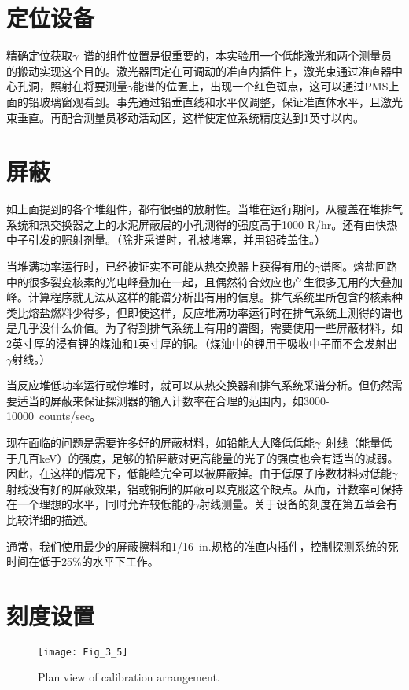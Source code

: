 \section{定位设备}

精确定位获取$\gamma$\ 谱的组件位置是很重要的，本实验用一个低能激光和两个测量员的搬动实现这个目的。激光器固定在可调动的准直内插件上，激光束通过准直器中心孔洞，照射在将要测量$\gamma$能谱的位置上，出现一个红色斑点，这可以通过PMS上面的铅玻璃窗观看到。事先通过铅垂直线和水平仪调整，保证准直体水平，且激光束垂直。再配合测量员移动活动区，这样使定位系统精度达到1英寸以内。

\section{屏蔽}

如上面提到的各个堆组件，都有很强的放射性。当堆在运行期间，从覆盖在堆排气系统和热交换器之上的水泥屏蔽层的小孔测得的强度高于1000 R/hr。还有由快热中子引发的照射剂量。（除非采谱时，孔被堵塞，并用铅砖盖住。）

当堆满功率运行时，已经被证实不可能从热交换器上获得有用的$\gamma$谱图。熔盐回路中的很多裂变核素的光电峰叠加在一起，且偶然符合效应也产生很多无用的大叠加峰。计算程序就无法从这样的能谱分析出有用的信息。排气系统里所包含的核素种类比熔盐燃料少得多，但即使这样，反应堆满功率运行时在排气系统上测得的谱也是几乎没什么价值。为了得到排气系统上有用的谱图，需要使用一些屏蔽材料，如2英寸厚的浸有锂的煤油和1英寸厚的铜。（煤油中的锂用于吸收中子而不会发射出$\gamma$射线。）

当反应堆低功率运行或停堆时，就可以从热交换器和排气系统采谱分析。但仍然需要适当的屏蔽来保证探测器的输入计数率在合理的范围内，如3000-10000\ counts/sec。

现在面临的问题是需要许多好的屏蔽材料，如铅能大大降低低能$\gamma$\ 射线（能量低于几百keV）的强度，足够的铅屏蔽对更高能量的光子的强度也会有适当的减弱。因此，在这样的情况下，低能峰完全可以被屏蔽掉。由于低原子序数材料对低能$\gamma$射线没有好的屏蔽效果，铝或铜制的屏蔽可以克服这个缺点。从而，计数率可保持在一个理想的水平，同时允许较低能的$\gamma$射线测量。关于设备的刻度在第五章会有比较详细的描述。

通常，我们使用最少的屏蔽擦料和1/16\ in.规格的准直内插件，控制探测系统的死时间在低于25\%的水平下工作。

\section{刻度设置}

\begin{figure}
\centering
\texttt{[image: Fig\_3\_5]}
\caption{Plan view of calibration arrangement.}
\label{Fig_3_5}
\end{figure}

